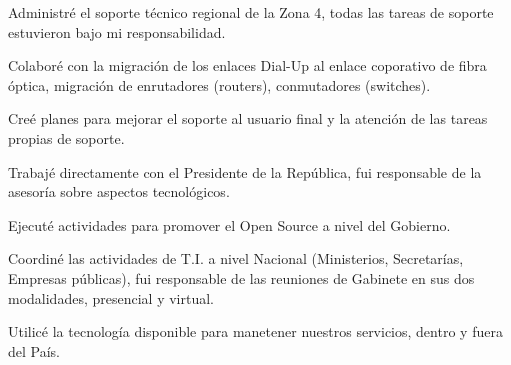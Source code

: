 \documentclass[]{plushcv}
\begin{document}
\begin{minipage}[t]{0.70\textwidth}
\begin{tightemize}
\sectionsep
\item Administré el soporte técnico regional de la Zona 4, todas las tareas de soporte estuvieron bajo mi responsabilidad.
\item Colaboré con la migración de los enlaces Dial-Up al enlace coporativo de fibra óptica, migración de enrutadores (routers), conmutadores (switches).
\item Creé planes para mejorar el soporte al usuario final y la atención de las tareas propias de soporte.
\end{tightemize}
\sectionsep

\begin{tightemize}
\sectionsep
\item Trabajé directamente con el Presidente de la República, fui responsable de la asesoría sobre aspectos tecnológicos.
\item Ejecuté actividades para promover el Open Source a nivel del Gobierno.
\item Coordiné las actividades de T.I. a nivel Nacional (Ministerios, Secretarías, Empresas públicas), fui responsable de las reuniones de Gabinete en sus dos modalidades, presencial y virtual.
\item Utilicé la tecnología disponible para manetener nuestros servicios, dentro y fuera del País.
\end{tightemize}
\sectionsep



\end{minipage}
\end{document}
